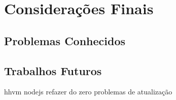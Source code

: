 \chapter{Considerações Finais}\label{consideracoes-finais}

\section{Problemas Conhecidos}

\section{Trabalhos Futuros}
hhvm
nodejs
refazer do zero
problemas de atualização